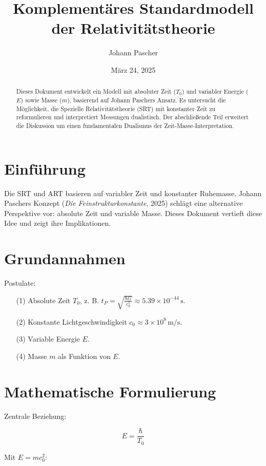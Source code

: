 \documentclass{article}
\title{Komplementäres Standardmodell der Relativitätstheorie}
\author{Johann Pascher}
\date{März 24, 2025}
\begin{document}
	
	\maketitle
	
	\begin{abstract}
		Dieses Dokument entwickelt ein Modell mit absoluter Zeit (\( T_0 \)) und variabler Energie (\( E \)) sowie Masse (\( m \)), basierend auf Johann Paschers Ansatz. Es untersucht die Möglichkeit, die Spezielle Relativitätstheorie (SRT) mit konstanter Zeit zu reformulieren und interpretiert Messungen dualistisch. Der abschließende Teil erweitert die Diskussion um einen fundamentalen Dualismus der Zeit-Masse-Interpretation.
	\end{abstract}
	
	\section{Einführung}
	
	Die SRT und ART basieren auf variabler Zeit und konstanter Ruhemasse. Johann Paschers Konzept (\textit{Die Feinstrukturkonstante}, 2025) schlägt eine alternative Perspektive vor: absolute Zeit und variable Masse. Dieses Dokument vertieft diese Idee und zeigt ihre Implikationen.
	
	\section{Grundannahmen}
	
	Postulate:
	\begin{enumerate}
		\item[(1)] Absolute Zeit \( T_0 \), z. B. \( t_P = \sqrt{\frac{\hbar G}{c_0^5}} \approx 5.39 \times 10^{-44} \, \text{s} \).
		\item[(2)] Konstante Lichtgeschwindigkeit \( c_0 \approx 3 \times 10^8 \, \text{m/s} \).
		\item[(3)] Variable Energie \( E \).
		\item[(4)] Masse \( m \) als Funktion von \( E \).
	\end{enumerate}
	
	\section{Mathematische Formulierung}
	
	Zentrale Beziehung:
	
	\[
	E = \frac{\hbar}{T_0}
	\]
	
	Mit \( E = m c_0^2 \):
	
\end{document}
